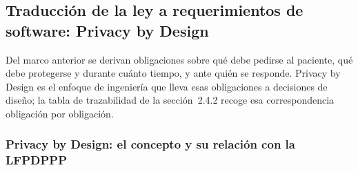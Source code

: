 \documentclass[12pt, a4paper]{article}
\begin{document}
\subsection{Traducción de la ley a requerimientos de software:
Privacy by Design}
Del marco anterior se derivan obligaciones sobre qué debe pedirse
al paciente, qué debe protegerse y durante cuánto tiempo, y ante
quién se responde. Privacy by Design es el enfoque de ingeniería
que lleva esas obligaciones a decisiones de diseño; la tabla de
trazabilidad de la sección~2.4.2 recoge esa correspondencia obligación por
obligación.

\subsubsection{Privacy by Design: el concepto y su relación con
la LFPDPPP}
\end{document}
